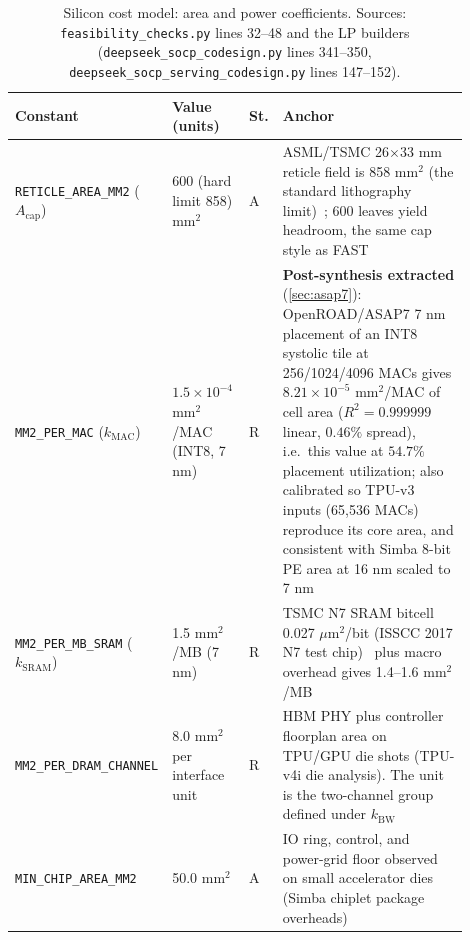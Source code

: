 \begin{table}[!htb]
\centering
\caption{Silicon cost model: area and power coefficients. Sources: \texttt{feasibility\_\allowbreak checks.py} lines 32--48 and the LP builders (\texttt{deepseek\_\allowbreak socp\_\allowbreak codesign.py} lines 341--350, \texttt{deepseek\_\allowbreak socp\_\allowbreak serving\_\allowbreak codesign.py} lines 147--152).}
\label{tab:coeff_cost_model}
\footnotesize\setlength{\tabcolsep}{3pt}
\begin{tabular}{@{}p{0.26\linewidth}p{0.17\linewidth}p{0.045\linewidth}p{0.42\linewidth}@{}}
\toprule
Constant & Value (units) & St. & Anchor \\
\midrule
\texttt{RETICLE\_\allowbreak AREA\_\allowbreak MM2} ($A_{\mathrm{cap}}$) & 600 (hard limit 858) $\mathrm{mm}^2$ & A & ASML/TSMC 26$\times$33 mm reticle field is 858 $\mathrm{mm}^2$ (the standard lithography limit)~\citep{asml_nxt2000i}; 600 leaves yield headroom, the same cap style as FAST \citep{zhang_fast} \\
\texttt{MM2\_\allowbreak PER\_\allowbreak MAC} ($k_{\mathrm{MAC}}$) & $1.5\times10^{-4}$ $\mathrm{mm}^2$/MAC (INT8, 7 nm) & R & \textbf{Post-synthesis extracted} (\cref{sec:asap7}): OpenROAD/ASAP7 7 nm placement of an INT8 systolic tile at 256/1024/4096 MACs gives $8.21\times10^{-5}$ $\mathrm{mm}^2$/MAC of cell area ($R^2=0.999999$ linear, $0.46\%$ spread), i.e.\ this value at $54.7\%$ placement utilization; also calibrated so TPU-v3 inputs (65{,}536 MACs) reproduce its core area, and consistent with Simba 8-bit PE area at 16 nm scaled to 7 nm \citep{shao2019simba} \\
\texttt{MM2\_\allowbreak PER\_\allowbreak MB\_\allowbreak SRAM} ($k_{\mathrm{SRAM}}$) & 1.5 $\mathrm{mm}^2$/MB (7 nm) & R & TSMC N7 SRAM bitcell 0.027 $\mu\mathrm{m}^2$/bit (ISSCC 2017 N7 test chip)~\citep{chang2017sram7nm} plus macro overhead gives 1.4--1.6 $\mathrm{mm}^2$/MB \\
\texttt{MM2\_\allowbreak PER\_\allowbreak DRAM\_\allowbreak CHANNEL} & 8.0 $\mathrm{mm}^2$ per interface unit & R & HBM PHY plus controller floorplan area on TPU/GPU die shots (TPU-v4i die analysis). The unit is the two-channel group defined under $k_{\mathrm{BW}}$ \citep{jouppi2021ten} \\
\texttt{MIN\_\allowbreak CHIP\_\allowbreak AREA\_\allowbreak MM2} & 50.0 $\mathrm{mm}^2$ & A & IO ring, control, and power-grid floor observed on small accelerator dies (Simba chiplet package overheads) \citep{shao2019simba} \\

\end{tabular}
\end{table}
